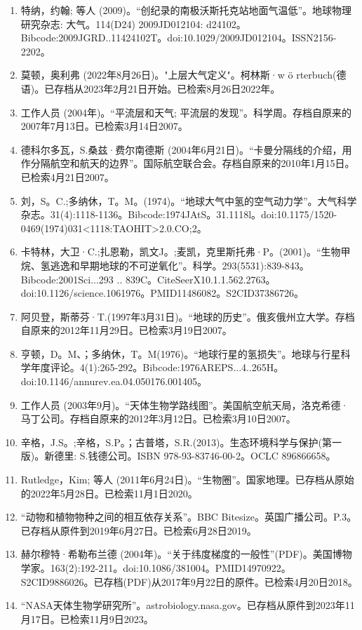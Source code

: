 \begin{enumerate}
\item 特纳，约翰; 等人 (2009)。“创纪录的南极沃斯托克站地面气温低”。地球物理研究杂志: 大气。114(D24) 2009JD012104: d24102。Bibcode:2009JGRD..11424102T。doi:10.1029/2009JD012104。ISSN2156-2202。 
\item 莫顿，奥利弗 (2022年8月26日)。"上层大气定义"。柯林斯·w ö rterbuch(德语)。已存档从2023年2月21日开始。已检索8月26日2022年。
\item 工作人员 (2004年)。“平流层和天气; 平流层的发现”。科学周。存档自原来的2007年7月13日。已检索3月14日2007。
\item 德科尔多瓦，S.桑兹·费尔南德斯 (2004年6月21日)。“卡曼分隔线的介绍，用作分隔航空和航天的边界”。国际航空联合会。存档自原来的2010年1月15日。已检索4月21日2007。
\item 刘，S。C.;多纳休，T。M。(1974)。“地球大气中氢的空气动力学”。大气科学杂志。31(4):1118-1136。Bibcode:1974JAtS。31.1118l。doi:10.1175/1520-0469(1974)031<1118:TAOHIT>2.0.CO;2。
\item 卡特林，大卫·C.;扎恩勒，凯文J。;麦凯，克里斯托弗·P。(2001)。“生物甲烷、氢逃逸和早期地球的不可逆氧化”。科学。293(5531):839-843。Bibcode:2001Sci...293 .. 839C。CiteSeerX10.1.1.562.2763。doi:10.1126/science.1061976。PMID11486082。S2CID37386726。   
\item 阿贝登，斯蒂芬·T.(1997年3月31日)。“地球的历史”。俄亥俄州立大学。存档自原来的2012年11月29日。已检索3月19日2007。
\item 亨顿，D。M、；多纳休，T。M(1976)。“地球行星的氢损失”。地球与行星科学年度评论。4(1):265-292。Bibcode:1976AREPS...4..265H。doi:10.1146/annurev.ea.04.050176.001405。
\item 工作人员 (2003年9月)。“天体生物学路线图”。美国航空航天局，洛克希德·马丁公司。存档自原来的2012年3月12日。已检索3月10日2007。
\item 辛格，J.S。;辛格，S.P。；古普塔，S.R.(2013)。生态环境科学与保护(第一版)。新德里: S.钱德公司。ISBN 978-93-83746-00-2。OCLC 896866658。
\item Rutledge，Kim; 等人 (2011年6月24日)。“生物圈”。国家地理。已存档从原始的2022年5月28日。已检索11月1日2020。
\item “动物和植物物种之间的相互依存关系”。BBC Bitesize。英国广播公司。P.3。已存档从原件到2019年6月27日。已检索6月28日2019。
\item 赫尔穆特·希勒布兰德 (2004年)。“关于纬度梯度的一般性”(PDF)。美国博物学家。163(2):192-211。doi:10.1086/381004。PMID14970922。S2CID9886026。已存档(PDF)从2017年9月22日的原件。已检索4月20日2018。   
\item “NASA天体生物学研究所”。astrobiology.nasa.gov。已存档从原件到2023年11月17日。已检索11月9日2023。

\end{enumerate}
